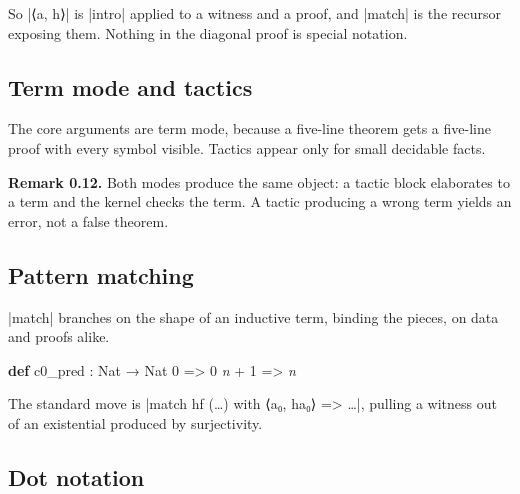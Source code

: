 \documentclass{memoir}
\begin{document}
So \LeanVerb|⟨a, h⟩| is \LeanVerb|intro| applied to a witness and a proof, and \LeanVerb|match| is the
recursor exposing them. Nothing in the diagonal proof is special notation.



\subsection{Term mode and tactics}\label{Two--Schemas--of--Impossibility-005F-005F-005F--Machine--Checked--Limits--of--Trustworthy--Machine--Learning-005F-005F-005F--and--Why--They--Tighten--with--Capability----Preliminaries----How--to--read--the--Lean--4----Term--mode--and--tactics}

The core arguments are term mode, because a five-line theorem gets a five-line
proof with every symbol visible. Tactics appear only for small decidable facts.

\textbf{Remark 0.12.} Both modes produce the same object: a tactic block elaborates to a term
and the kernel checks the term. A tactic producing a wrong term yields an error,
not a false theorem.



\subsection{Pattern matching}\label{Two--Schemas--of--Impossibility-005F-005F-005F--Machine--Checked--Limits--of--Trustworthy--Machine--Learning-005F-005F-005F--and--Why--They--Tighten--with--Capability----Preliminaries----How--to--read--the--Lean--4----Pattern--matching}

\LeanVerb|match| branches on the shape of an inductive term, binding the pieces, on data
and proofs alike.

\begin{LeanVerbatim}
\textbf{def} c0_pred : Nat → Nat
   0 => 0
   \textit{n} + 1 => \textit{n}

\end{LeanVerbatim}


The standard move is \LeanVerb|match hf (…) with  ⟨a₀, ha₀⟩ => …|, pulling a witness out
of an existential produced by surjectivity.



\subsection{Dot notation}\label{Two--Schemas--of--Impossibility-005F-005F-005F--Machine--Checked--Limits--of--Trustworthy--Machine--Learning-005F-005F-005F--and--Why--They--Tighten--with--Capability----Preliminaries----How--to--read--the--Lean--4----Dot--notation}
\end{document}
